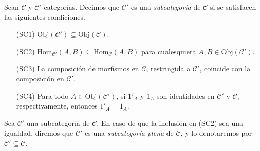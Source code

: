 \documentclass[tesis]{subfiles}
\begin{document}
\begin{Def} \label{Def: Subcategoría}
    Sean $\mathscr{C}$ y $\mathscr{C}'$ categorías. Decimos que $\mathscr{C}'$ es una \emph{subcategoría} de $\mathscr{C}$ si se satisfacen las siguientes condiciones.

    \begin{itemize}
    
        \item[(SC1)] $\text{Obj}(\mathscr{C}')\subseteq\text{Obj}(\mathscr{C})$.

        \item[(SC2)] $\text{Hom}_{\mathscr{C}'}(A,B) \subseteq \text{Hom}_\mathscr{C}(A,B)$ para cualesquiera $A,B\in\text{Obj}(\mathscr{C}')$.
            
        \item[(SC3)] La composición de morfismos en $\mathscr{C}$, restringida a $\mathscr{C}'$, coincide con la composición en $\mathscr{C}'$.

        \item[(SC4)] Para todo $A\in\text{Obj}(\mathscr{C}')$, si $1'_A$ y $1_A$ son identidades en $\mathscr{C}'$ y $\mathscr{C}$, respectivamente, entonces $1'_A=1_A$.
    \end{itemize}

    \noindent Sea $\mathscr{C}'$ una subcategoría de $\mathscr{C}$. En caso de que la inclusión en (SC2) sea una igualdad, diremos que $\mathscr{C}'$ es una \emph{subcategoría plena} de $\mathscr{C}$, y lo denotaremos por $\mathscr{C}'\subseteq\mathscr{C}$.
\end{Def}
\end{document}
